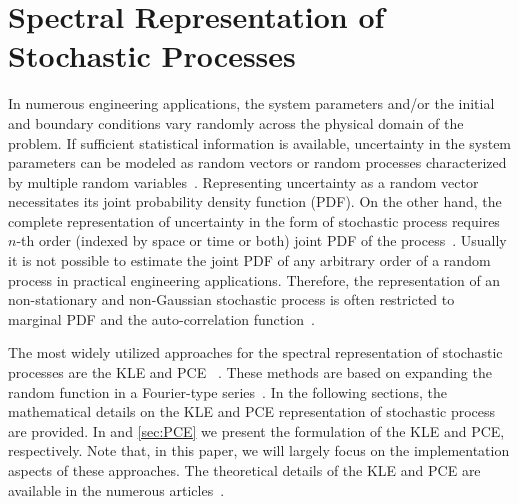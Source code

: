 \documentclass[letter,1p,11pt,oneside,onecolumn,sort&compress]{elsarticle}
\begin{document}
\section{Spectral Representation of Stochastic Processes} \label{sec:SRSP}
In numerous engineering applications, the system parameters and/or the initial and boundary conditions vary randomly across the physical domain of the problem. If sufficient statistical information is available, uncertainty in the system parameters can be modeled as random vectors or random processes characterized by multiple random variables~\cite{ghanemSFEM1991,le2010spectral}. %
Representing uncertainty as a random vector necessitates its joint probability density function (PDF).
On the other hand, the complete representation of uncertainty in the form of stochastic process
requires $n$-th order (indexed by space or time or both) joint PDF of the process~\cite{papoulis2002probability,ghanemSFEM1991,le2010spectral,ghanem1999ingredients}.
Usually it is not possible to estimate the joint PDF of any arbitrary order of a random process in practical engineering applications. Therefore, the representation of an non-stationary and non-Gaussian stochastic process is often restricted to marginal PDF and the auto-correlation function~\cite{papoulis2002probability,ghanemSFEM1991,billingsley2008probability}. %

The most widely utilized approaches for the spectral representation of stochastic processes are the KLE and PCE ~\cite{ghanemSFEM1991,xiu2002wiener,le2010spectral}.
These methods are based on expanding the random function in a Fourier-type series~\cite{ghanemSFEM1991,le2010spectral}.
In the following sections, the mathematical details on the KLE and PCE representation of stochastic process are provided. In  and \ref{sec:PCE} we present the formulation of the KLE and PCE, respectively.
Note that, in this paper, we will largely focus on the implementation aspects of these approaches. %
The theoretical details of the KLE and PCE are available in the numerous articles~\cite{ghanemSFEM1991,le2010spectral,ghanem1999stochastic,ghanem1999ingredients,babuska2004galerkin,babuvska2005solving,ghanem1999nonlinear,xiu2002wiener,xiuNMSC2010}.
\end{document}
